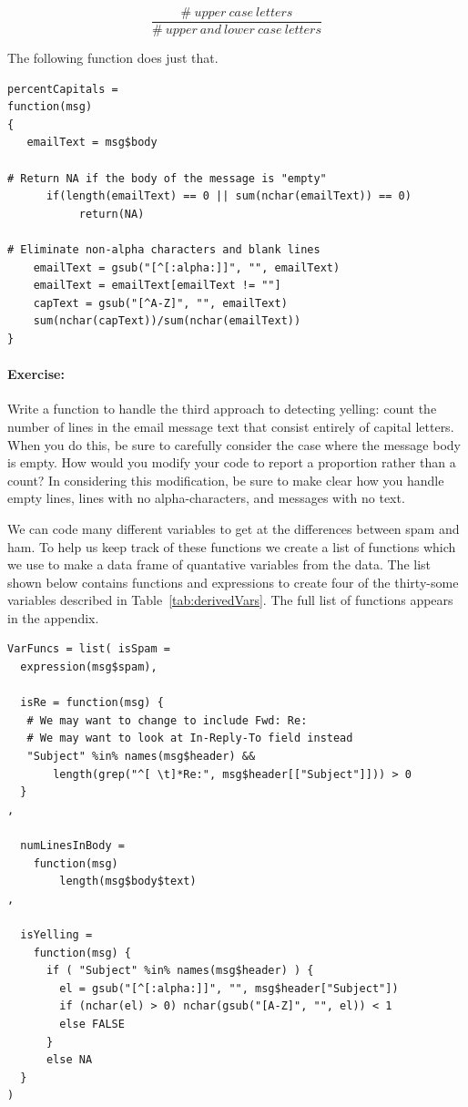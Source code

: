 $$ \frac {\# ~upper~case~letters}{\# ~ upper ~ and ~ lower ~case ~letters}$$

The following function  does just that.

{\footnotesize{
\begin{verbatim}
percentCapitals =
function(msg)
{
   emailText = msg$body

# Return NA if the body of the message is "empty"
      if(length(emailText) == 0 || sum(nchar(emailText)) == 0)
           return(NA)

# Eliminate non-alpha characters and blank lines 
    emailText = gsub("[^[:alpha:]]", "", emailText)
    emailText = emailText[emailText != ""]
    capText = gsub("[^A-Z]", "", emailText)
    sum(nchar(capText))/sum(nchar(emailText))
}
\end{verbatim}
}}

\paragraph{Exercise:} Write a function to handle the third approach
to detecting yelling: count the number of lines in the email message
text that consist entirely of capital letters. 
When you do this, be sure to carefully consider the case where
the message body is empty.
How would you modify your code to report a proportion rather
than a count? 
In considering this modification, be sure to make clear
how you handle empty lines, lines with no alpha-characters,
and messages with no text. $\quad$

We can code many different variables to get at the differences 
between spam and ham. To help us keep track of these functions we
create a list of functions which we use to make a data frame of 
quantative variables from the data.
The list shown below contains functions and expressions to create
four of the thirty-some variables described in Table~\ref{tab:derivedVars}.
The full list of functions appears in the appendix.

{\footnotesize{
\begin{verbatim}
VarFuncs = list( isSpam =
  expression(msg$spam),

  isRe = function(msg) {
   # We may want to change to include Fwd: Re:  
   # We may want to look at In-Reply-To field instead
   "Subject" %in% names(msg$header) && 
       length(grep("^[ \t]*Re:", msg$header[["Subject"]])) > 0
  }
,

  numLinesInBody =
    function(msg)
        length(msg$body$text)
,

  isYelling =
    function(msg) {
      if ( "Subject" %in% names(msg$header) ) {
        el = gsub("[^[:alpha:]]", "", msg$header["Subject"])
        if (nchar(el) > 0) nchar(gsub("[A-Z]", "", el)) < 1
        else FALSE
      }
      else NA
  }
)
\end{verbatim}
}}


